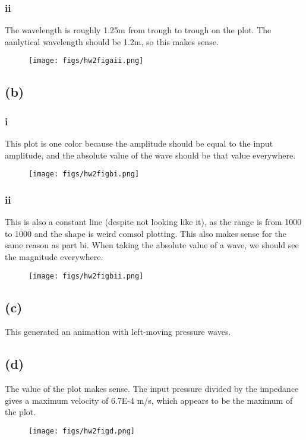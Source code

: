 \documentclass[12 pt]{article}
\begin{document}
\subsubsection*{ii}
The wavelength is roughly 1.25m from trough to trough on the plot. The aanlytical wavelength should be 1.2m, so this
makes sense.
\begin{figure}[H]
    \centering
    \texttt{[image: figs/hw2figaii.png]}
\end{figure} \par

\subsection*{(b)}
\subsubsection*{i}
This plot is one color because the amplitude should be equal to the input amplitude, and the absolute value of the wave
should be that value everywhere.
\begin{figure}[H]
    \centering
    \texttt{[image: figs/hw2figbi.png]}
\end{figure} \par

\subsubsection*{ii}
This is also a constant line (despite not looking like it), as the range is from 1000 to 1000 and the shape is weird
comsol plotting. This also makes sense for the same reason as part bi. When taking the absolute value of a wave, we
should see the magnitude everywhere.
\begin{figure}[H]
    \centering
    \texttt{[image: figs/hw2figbii.png]}
\end{figure} \par

\subsection*{(c)}
This generated an animation with left-moving pressure waves.

\subsection*{(d)}
The value of the plot makes sense. The input pressure divided by the impedance gives a maximum velocity of 6.7E-4 m/s,
which appears to be the maximum of the plot.
\begin{figure}[H]
    \centering
    \texttt{[image: figs/hw2figd.png]}
\end{figure} \par


\end{document}
